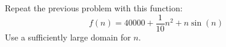
Repeat the previous problem with this function:
\[
f(n) = 40000 + \frac{1}{10}n^2 + n \sin(n)
\]
Use a sufficiently large domain for $n$.
